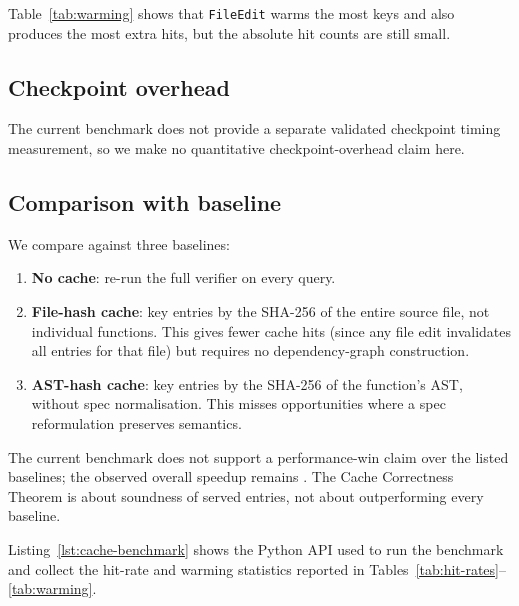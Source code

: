\documentclass[11pt]{article}
\begin{document}
Table~\ref{tab:warming} shows that \texttt{FileEdit} warms the most keys
and also produces the most extra hits, but the absolute hit counts are
still small.

\subsection{Checkpoint overhead}

The current benchmark does not provide a separate validated checkpoint
timing measurement, so we make no quantitative checkpoint-overhead claim
here.

\subsection{Comparison with baseline}

We compare against three baselines:
\begin{enumerate}[label=(\roman*)]
\item \textbf{No cache}: re-run the full verifier on every query.
\item \textbf{File-hash cache}: key entries by the SHA-256 of the
  entire source file, not individual functions.  This gives fewer
  cache hits (since any file edit invalidates all entries for that
  file) but requires no dependency-graph construction.
\item \textbf{AST-hash cache}: key entries by the SHA-256 of the
  function's AST, without spec normalisation.  This misses
  opportunities where a spec reformulation preserves semantics.
\end{enumerate}

The current benchmark does not support a performance-win claim over the
listed baselines; the observed overall speedup remains
\ppXXXVIIISpeedup.  The Cache Correctness Theorem is about soundness of
served entries, not about outperforming every baseline.

Listing~\ref{lst:cache-benchmark} shows the Python API used to run
the benchmark and collect the hit-rate and warming statistics reported
in Tables~\ref{tab:hit-rates}--\ref{tab:warming}.
\end{document}
